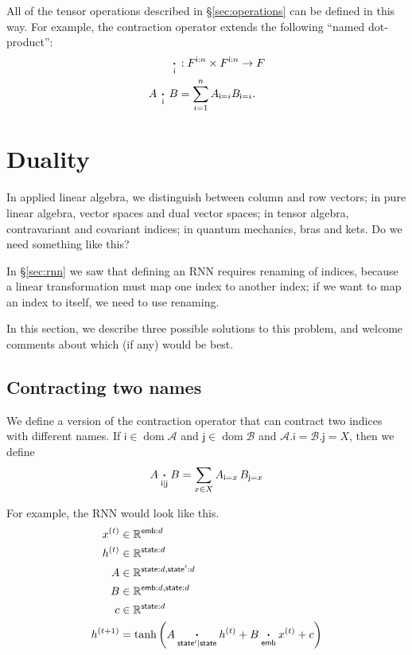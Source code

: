 \documentclass{article}
\newcommand{\name}[1]{\mathsf{#1}}
\newcommand{\nidx}[2]{\name{#1}=#2}
\newcommand{\nset}[2]{\name{#1}:#2}
\newcommand{\ndot}[1]{\mathbin{\mathop{\thinspace\boldsymbol\cdot\thinspace}\limits_{\name{#1}}}}
\newcommand{\nndot}[2]{\mathbin{\mathop{\thinspace\boldsymbol\cdot\thinspace}\limits_{\name{#1}|\name{#2}}}}
\DeclareMathOperator{\tupledom}{dom}
\newcommand{\tupleproj}[2]{#1.\name{#2}}
\begin{document}
All of the tensor operations described in \S\ref{sec:operations} can be defined in this way. For example, the contraction operator extends the following ``named dot-product'':
\begin{align*}
\ndot{i} &: F^{\nset{i}{n}} \times F^{\nset{i}{n}} \rightarrow F \\
A \ndot{i} B &= \sum_{i=1}^n A_{\nidx{i}{i}} B_{\nidx{i}{i}}.
\end{align*}

\section{Duality}
\label{sec:duality}

In applied linear algebra, we distinguish between column and row vectors; in pure linear algebra, vector spaces and dual vector spaces; in tensor algebra, contravariant and covariant indices; in quantum mechanics, bras and kets. Do we need something like this?

In \S\ref{sec:rnn} we saw that defining an RNN requires renaming of indices, because a linear transformation must map one index to another index; if we want to map an index to itself, we need to use renaming.

In this section, we describe three possible solutions to this problem, and welcome comments about which (if any) would be best.

\subsection{Contracting two names}

We define a version of the contraction operator that can contract two indices with different names. If $\name{i} \in \tupledom \mathcal{A}$ and $\name{j} \in \tupledom \mathcal{B}$ and $\tupleproj{\mathcal{A}}{i} = \tupleproj{\mathcal{B}}{j} = X$, then we define
\begin{equation*}
A \nndot{i}{j} B = \sum_{x \in X} A_{\nidx{i}{x}} \, B_{\nidx{j}{x}}
\end{equation*}

For example, the RNN would look like this.
\begin{align*}
x^{(t)} &\in \mathbb{R}^{\nset{emb}{d}} \\
h^{(t)} &\in \mathbb{R}^{\nset{state}{d}} \\
A &\in \mathbb{R}^{\nset{state}{d}, \nset{state'}{d}} \\
B &\in \mathbb{R}^{\nset{emb}{d}, \nset{state}{d}} \\
c &\in \mathbb{R}^{\nset{state}{d}} \\
h^{(t+1)} &= \tanh\left( A \nndot{state'}{state} h^{(t)} + B \ndot{emb} x^{(t)} + c \right)
\end{align*}
\end{document}
